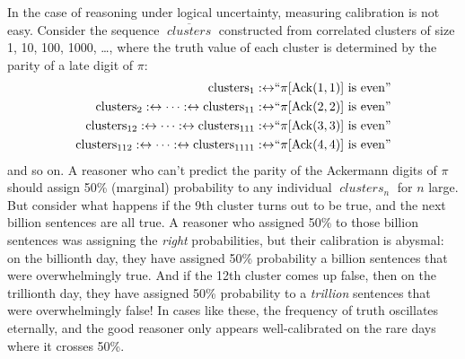 \documentclass[authordate,onecolumn,noenvironments]{miri-tech-article}
\numberwithin{equation}{subsection}
\renewcommand{\iff}{\leftrightarrow}
\newcommand{\quot}[1]{``#1"}
\newcommand{\seq}[1]{{\overline{#1}}}
\newcommand{\Ack}{\operatorname{Ack}}
\newcommand{\nn}{n}
\newcommand{\clusters}{\mathit{\operatorname{clusters}}}
\begin{document}
In the case of reasoning under logical uncertainty, measuring calibration is not easy. Consider the sequence $\seq\clusters$ constructed from correlated clusters of size 1, 10, 100, 1000, \ldots, where the truth value of each cluster is determined by the parity of a late digit of $\pi$:
\begin{align*}
  \clusters_1 :\iff & \quot{\pi[\Ack(1,1)]\text{ is even}} \\
  \clusters_2 :\iff \cdots :\iff \clusters_{11} :\iff & \quot{\pi[\Ack(2,2)]\text{ is even}} \\
  \clusters_{12} :\iff \cdots :\iff \clusters_{111} :\iff & \quot{\pi[\Ack(3,3)]\text{ is even}} \\
  \clusters_{112} :\iff \cdots :\iff \clusters_{1111} :\iff & \quot{\pi[\Ack(4,4)]\text{ is even}}
\end{align*}
and so on. A reasoner who can't predict the parity of the Ackermann digits of $\pi$ should assign 50\% (marginal) probability to any individual $\clusters_\nn$ for $\nn$ large. But consider what happens if the 9th cluster turns out to be true, and the next billion sentences are all true. A reasoner who assigned 50\% to those billion sentences was assigning the \emph{right} probabilities, but their calibration is abysmal: on the billionth day, they have assigned 50\% probability a billion sentences that were overwhelmingly true. And if the 12th cluster comes up false, then on the trillionth day, they have assigned 50\% probability to a \emph{trillion} sentences that were overwhelmingly false! In cases like these, the frequency of truth oscillates eternally, and the good reasoner only appears well-calibrated on the rare days where it crosses 50\%.
\end{document}
